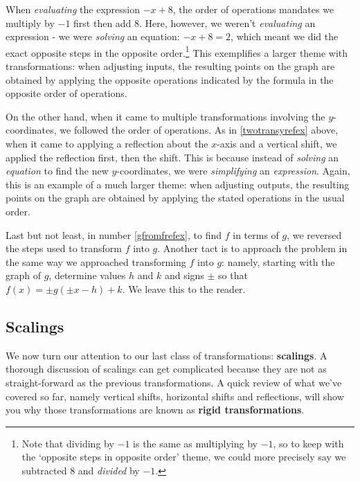 \documentclass{ximera}
\begin{document}
\smallskip

When \textit{evaluating} the expression $-x+8$, the order of operations mandates we multiply by $-1$ first then add $8$.  Here, however, we weren't \textit{evaluating} an expression - we were \textit{solving} an equation:  $-x+8 = 2$, which meant we did the exact opposite steps in the opposite order.\footnote{Note that dividing by $-1$ is the same as multiplying by $-1$, so to keep with the `opposite steps in opposite order' theme, we could more precisely say we subtracted $8$ and \textit{divided} by $-1$.}  This exemplifies a larger theme with transformations:  when adjusting inputs, the resulting points on the graph are obtained by applying the opposite operations indicated by the formula in the opposite order of operations.



\smallskip


On the other hand, when it came to multiple transformations involving the $y$-coordinates, we followed the order of operations. As in \ref{twotransyrefex} above, when it came to applying a reflection about the $x$-axis and a vertical shift, we applied the reflection first, then the shift.  This is because instead of \textit{solving} an \textit{equation} to find the new $y$-coordinates, we were \textit{simplifying }an \textit{expression}.  Again, this is an example of a much larger theme:  when adjusting outputs, the resulting points on the graph are obtained by applying the stated operations in the usual order.


\smallskip


Last but not least, in number \ref{gfromfrefex}, to find $f$ in terms of $g$, we reversed the steps used to transform $f$ into $g$.  Another tact is to approach the problem in the same way we approached transforming $f$ into $g$: namely, starting with the graph of $g$, determine values $h$ and $k$ and signs $\pm$ so that $f(x) = \pm g(\pm x - h) + k$.  We leave this to the reader.


\subsection{Scalings}
\label{Scaling}

We now turn our attention to our last class of transformations: \textbf{scalings}.  A thorough discussion of scalings can get complicated because they are not as straight-forward as the previous transformations.  A quick review of what we've covered so far, namely vertical shifts, horizontal shifts and reflections, will show you why those transformations are known as \textbf{rigid transformations}.  
\end{document}
